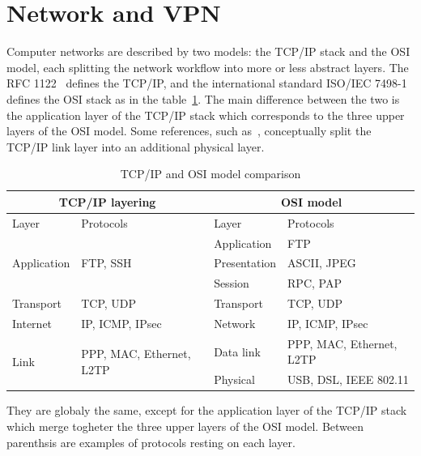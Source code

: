 \section{Network and VPN}\label{sec:theory-network}

Computer networks are described by two models: the TCP/IP stack and the OSI model, each splitting the network workflow into more or less abstract layers.
The RFC 1122~\cite{rfc1122} defines the TCP/IP, and the international standard ISO/IEC 7498-1~\cite{ISOIEC7498} defines the OSI stack as in the table~\ref{tab:tcp-ip-stack}.
The main difference between the two is the application layer of the TCP/IP stack which corresponds to the three upper layers of the OSI model.
Some references, such as~\citet{tanenbaum2011}, conceptually split the TCP/IP link layer into an additional physical layer.

\begin{table}[ht]
\center
\begin{tabularx}{\textwidth}{|l|l|l|X|} \hline
\multicolumn{2}{|c|}{TCP/IP layering} & \multicolumn{2}{c|}{OSI model} \\ \hline
Layer & Protocols & Layer & Protocols \\ \hline
\multirow{3}{*}{Application} & \multirow{3}{*}{FTP, SSH} & Application & FTP \\ \cline{3-4}
 & & Presentation & ASCII, JPEG \\ \cline{3-4}
 & & Session & RPC, PAP \\ \hline
Transport & TCP, UDP & Transport & TCP, UDP \\ \hline
Internet & IP, ICMP, IPsec & Network & IP, ICMP, IPsec \\ \hline
\multirow{2}{*}{Link} & \multirow{2}{*}{PPP, MAC, Ethernet, L2TP} & Data link & PPP, MAC, Ethernet, L2TP \\ \cline{3-4}
 & & Physical & USB, DSL, IEEE 802.11 \\ \hline
\end{tabularx}
\caption{TCP/IP and OSI model comparison}{They are globaly the same, except for the application layer of the TCP/IP stack which merge togheter the three upper layers of the OSI model. Between parenthsis are examples of protocols resting on each layer.}
\label{tab:tcp-ip-stack}
\end{table}


